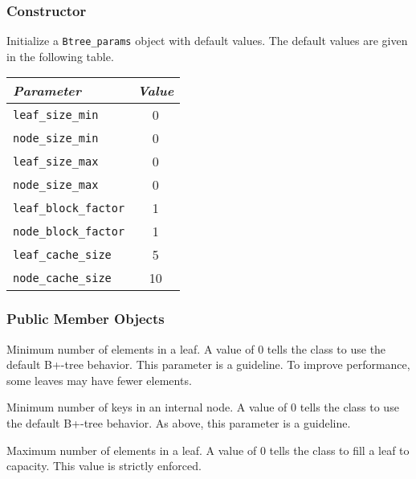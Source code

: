 \btabb

   {}

\etabb

\subsubsection{Constructor}

\btabb

   {Initialize a {\tt Btree\_params} object with
  default values. The default values are given in the following table.\\[1mm]
  \begin{tabular}{|l|c|}
    \hline
    {\em Parameter} & {\em Value} \\ \hline
    {\tt leaf\_size\_min} & 0 \\ \hline
    {\tt node\_size\_min} & 0 \\ \hline
    {\tt leaf\_size\_max} & 0 \\ \hline
    {\tt node\_size\_max} & 0 \\ \hline
    {\tt leaf\_block\_factor} & 1 \\ \hline
    {\tt node\_block\_factor} & 1 \\ \hline
    {\tt leaf\_cache\_size} & 5 \\ \hline
    {\tt node\_cache\_size} & 10 \\ \hline
  \end{tabular}
  }

\etabb

\subsubsection{Public Member Objects}

\btabb

   {Minimum number of elements in a leaf. A
  value of $0$ tells the class to use the default B+-tree behavior. This
  parameter is a guideline. To improve performance, some leaves may have
  fewer elements.}

   {Minimum number of keys in an internal
  node. A value of $0$ tells the class to use the default B+-tree
  behavior. As above, this parameter is a guideline.}

   {Maximum number of elements in a leaf. A
  value of $0$ tells the class to fill a leaf to capacity. This value is
  strictly enforced.}

